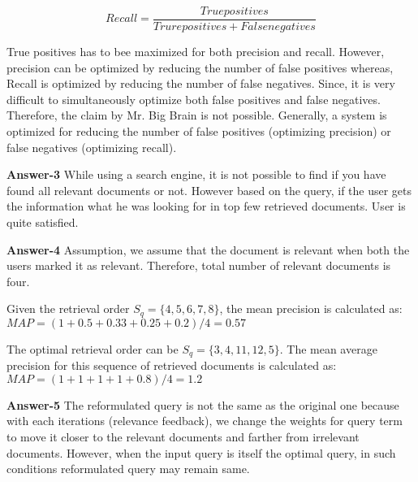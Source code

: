 \documentclass[10pt,onecolumn,letterpaper]{article}
\begin{document}
\begin{equation}
Recall=\frac{True positives}{Trure positives+ False negatives}
\end{equation}

True positives has to bee maximized for both precision and recall. However, precision can be optimized by reducing the number of false positives whereas, Recall is optimized by reducing the number of false negatives. Since, it is very difficult to simultaneously optimize both false positives and false negatives. Therefore, the claim by Mr. Big Brain is not possible.
Generally, a system is optimized for reducing the number of false positives (optimizing precision) or false negatives (optimizing recall).

\vspace{12pt}

\noindent\textbf{Answer-3}
While using a search engine, it is not possible to find if you have found all relevant documents or not. However based on the query, if the user gets the information what he was looking for in top few retrieved documents. User is quite satisfied.

\vspace{12pt}

\noindent\textbf{Answer-4}
Assumption, we assume that the document is relevant when both the users marked it as relevant. Therefore, total number of relevant documents is four.

Given the retrieval order $S_{q}=\{4,5,6,7,8\}$, the mean precision is calculated as:
$MAP=(1+0.5+0.33+0.25+0.2)/4=0.57$

The optimal retrieval order can be $S_q=\{3,4,11,12,5\}$. The mean average precision for this sequence of retrieved documents is calculated as:
$MAP=(1+1+1+1+0.8)/4=1.2$

\vspace{12pt}

\noindent\textbf{Answer-5}
The reformulated query is not the same as the original one because with each iterations (relevance feedback), we change the weights for query term to move it closer to the relevant documents and farther from irrelevant documents. However, when the input query is itself the optimal query, in such conditions reformulated query may remain same.
\end{document}
